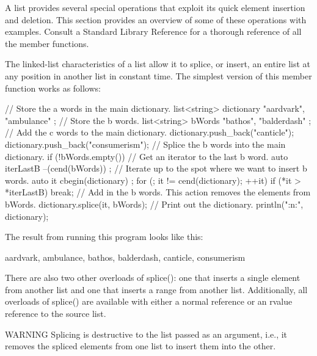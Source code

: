 
A list provides several special operations that exploit its quick element insertion and deletion. This section provides an overview of some of these operations with examples. Consult a Standard Library Reference for a thorough reference of all the member functions.


The linked-list characteristics of a list allow it to splice, or insert, an entire list at any position in another list in constant time. The simplest version of this member function works as follows:

\begin{cpp}
// Store the a words in the main dictionary.
list<string> dictionary { "aardvark", "ambulance" };
// Store the b words.
list<string> bWords { "bathos", "balderdash" };
// Add the c words to the main dictionary.
dictionary.push_back("canticle");
dictionary.push_back("consumerism");
// Splice the b words into the main dictionary.
if (!bWords.empty()) {
    // Get an iterator to the last b word.
    auto iterLastB { --(cend(bWords)) };
    // Iterate up to the spot where we want to insert b words.
    auto it { cbegin(dictionary) };
    for (; it != cend(dictionary); ++it) {
        if (*it > *iterLastB) { break; }
    }
    // Add in the b words. This action removes the elements from bWords.
    dictionary.splice(it, bWords);
}
// Print out the dictionary.
println("{:n:}", dictionary);
\end{cpp}

The result from running this program looks like this:

\begin{shell}
aardvark, ambulance, bathos, balderdash, canticle, consumerism
\end{shell}

There are also two other overloads of splice(): one that inserts a single element from another list and one that inserts a range from another list. Additionally, all overloads of splice() are available with either a normal reference or an rvalue reference to the source list.

\begin{myWarning}{WARNING}
Splicing is destructive to the list passed as an argument, i.e., it removes the spliced elements from one list to insert them into the other.
\end{myWarning}


